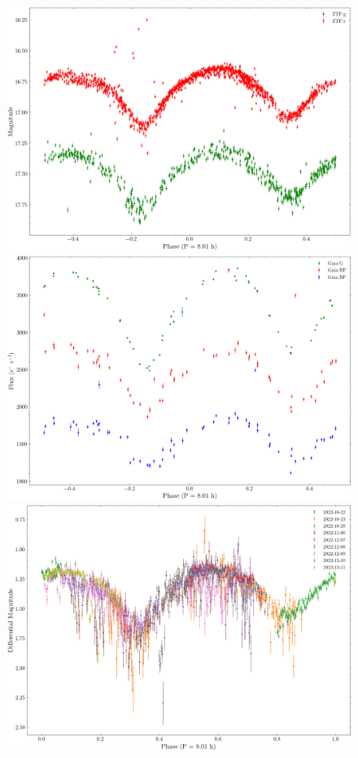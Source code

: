\begin{figure}[!h]
	\centering
	\includegraphics[scale=0.28]{Metodologia/Secciones/AnalisisPeriodo/Figures/ZTF Phase-Folded.png}
	\includegraphics[scale=0.28]{Metodologia/Secciones/AnalisisPeriodo/Figures/Gaia Phase-Folded.png}
	\includegraphics[scale=0.37]{Metodologia/Secciones/AnalisisPeriodo/Figures/Iturbide Phase-Folded.png}


\end{figure}
